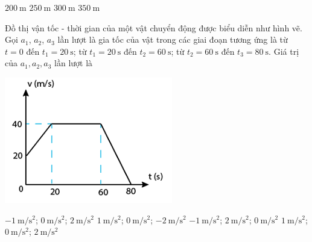 \begin{ex}
	\choice
	{$\SI{200}{\meter}$}
	{\True $\SI{250}{\meter}$}
	{$\SI{300}{\meter}$}
	{$\SI{350}{\meter}$}
\end{ex}

\begin{ex}
	Đồ thị vận tốc - thời gian của một vật chuyển động được biểu diễn như hình vẽ. Gọi $a_1$, $a_2$, $a_3$ lần lượt là gia tốc của vật trong các giai đoạn tương ứng là từ $t = 0$ đến $t_1 = \SI{20}{\second}$; từ $t_1 =\SI{20}{\second}$ đến $t_2 =\SI{60}{\second}$; từ $t_2 = \SI{60}{\second}$ đến $t_3 = \SI{80}{\second}$. Giá trị của $a_1, a_2, a_3$ lần lượt là
	\begin{center}
		\includegraphics[scale=0.5]{figs/G10Y25B6-16}
	\end{center}
	\choice
	{$\SI{-1}{\meter/\second^2}$; $\SI{0}{\meter/\second^2}$; $\SI{2}{\meter/\second^2}$}
	{\True $\SI{1}{\meter/\second^2}$; $\SI{0}{\meter/\second^2}$; $\SI{-2}{\meter/\second^2}$}
	{$\SI{-1}{\meter/\second^2}$; $\SI{2}{\meter/\second^2}$; $\SI{0}{\meter/\second^2}$}
	{$\SI{1}{\meter/\second^2}$; $\SI{0}{\meter/\second^2}$; $\SI{2}{\meter/\second^2}$}
\end{ex}



